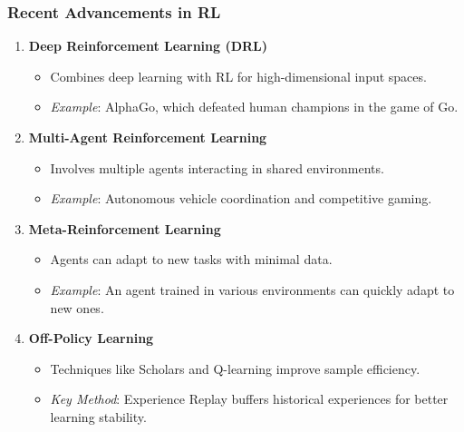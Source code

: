 \documentclass{beamer}
\begin{document}
\begin{frame}[fragile]
    \frametitle{Recent Advancements in RL}
    \begin{enumerate}
        \item \textbf{Deep Reinforcement Learning (DRL)}
            \begin{itemize}
                \item Combines deep learning with RL for high-dimensional input spaces.
                \item \textit{Example}: AlphaGo, which defeated human champions in the game of Go.
            \end{itemize}
        
        \item \textbf{Multi-Agent Reinforcement Learning}
            \begin{itemize}
                \item Involves multiple agents interacting in shared environments.
                \item \textit{Example}: Autonomous vehicle coordination and competitive gaming.
            \end{itemize}
        
        \item \textbf{Meta-Reinforcement Learning}
            \begin{itemize}
                \item Agents can adapt to new tasks with minimal data.
                \item \textit{Example}: An agent trained in various environments can quickly adapt to new ones.
            \end{itemize}
        
        \item \textbf{Off-Policy Learning}
            \begin{itemize}
                \item Techniques like Scholars and Q-learning improve sample efficiency.
                \item \textit{Key Method}: Experience Replay buffers historical experiences for better learning stability.
            \end{itemize}
    \end{enumerate}
\end{frame}
\end{document}
